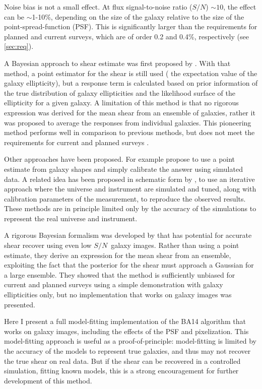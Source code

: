 \documentclass[12pt,preprint]{aastex}
\newcommand{\sn}{$S/N$}
\begin{document}
Noise bias is not a small effect.  At flux signal-to-noise ratio (\sn) $\sim
10$, the effect can be $\sim$1-10\%, depending on the size of the galaxy relative
to the size of the point-spread-function (PSF).  This is significantly larger
than the requirements for planned and current surveys, which are of order
0.2 and 0.4\%, respectively (see \ref{sec:req}).

A Bayesian approach to shear estimate was first proposed by \cite{Miller07}.
With that method, a point estimator for the shear is still used ( the
expectation value of the galaxy ellipticity), but a response term is calculated
based on prior information of the true distribution of galaxy ellipticities and
the likelihood surface of the ellipticity for a given galaxy.  A limitation of
this method is that no rigorous expression was derived for the mean shear from
an ensemble of galaxies, rather it was proposed to average the responses from
individual galaxies.  This pioneering method performs well in comparison to
previous methods, but does not meet the requirements for current and planned
surveys \citet{ba14}.

Other approaches have been proposed. For example \cite{Zuntz13} propose to use
a point estimate from galaxy shapes and simply calibrate the answer using
simulated data.  A related idea has been proposed in schematic form by
\cite{Refregier13}, to use an iterative approach where the universe and
instrument are simulated and tuned, along with calibration parameters of the
measurement, to reproduce the observed results.  These methods are in principle
limited only by the accuracy of the simulations to represent the real
universe and instrument.

A rigorous Bayesian formalism was developed by \cite[][herafter BA14]{ba14}
that has potential for accurate shear recover using even low \sn\ galaxy
images.  Rather than using a point estimate, they derive an expression for the
mean shear from an ensemble, exploiting the fact that the posterior for the
shear must approach a Gaussian for a large ensemble.  They showed that the
method is sufficiently unbiased for current and planned surveys using a simple
demonstration with galaxy ellipticities only, but no implementation that works
on galaxy images was presented.

Here I present a full model-fitting implementation of the BA14 algorithm that
works on galaxy images, including the effects of the PSF and pixelization.
This model-fitting approach is useful as a proof-of-principle:  model-fitting
is limited by the accuracy of the models to represent true galaxies, and thus
may not recover the true shear on real data.  But if the shear can be recovered
in a controlled simulation, fitting known models, this is a strong
encouragement for further development of this method.
\end{document}
